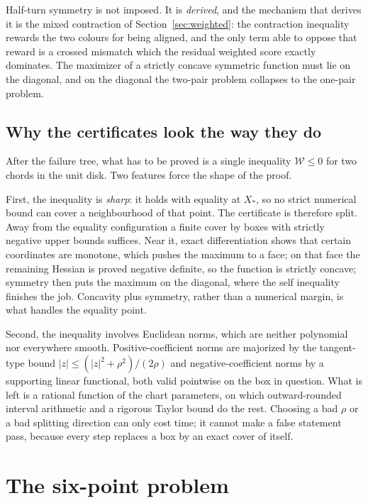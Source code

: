 \documentclass[11pt]{article}
\theoremstyle{plain}
\theoremstyle{definition}
\theoremstyle{remark}
\newcommand{\W}{\mathcal W}
\begin{document}
Half-turn symmetry is not imposed.  It is \emph{derived}, and the mechanism
that derives it is the mixed contraction of Section~\ref{sec:weighted}: the
contraction inequality rewards the two colours for being aligned, and the
only term able to oppose that reward is a crossed mismatch which the
residual weighted score exactly dominates.  The maximizer of a strictly
concave symmetric function must lie on the diagonal, and on the diagonal
the two-pair problem collapses to the one-pair problem.

\subsection{Why the certificates look the way they do}

After the failure tree, what has to be proved is a single inequality
$\W\le0$ for two chords in the unit disk.  Two features force the shape of
the proof.

First, the inequality is \emph{sharp}: it holds with equality at $X_*$, so
no strict numerical bound can cover a neighbourhood of that point.  The
certificate is therefore split.  Away from the equality configuration a
finite cover by boxes with strictly negative upper bounds suffices.  Near
it, exact differentiation shows that certain coordinates are monotone, which
pushes the maximum to a face; on that face the remaining Hessian is proved
negative definite, so the function is strictly concave; symmetry then puts
the maximum on the diagonal, where the self inequality finishes the job.
Concavity plus symmetry, rather than a numerical margin, is what handles the
equality point.

Second, the inequality involves Euclidean norms, which are neither
polynomial nor everywhere smooth.  Positive-coefficient norms are majorized
by the tangent-type bound $|z|\le(|z|^2+\rho^2)/(2\rho)$ and
negative-coefficient norms by a supporting linear functional, both valid
pointwise on the box in question.  What is left is a rational function of
the chart parameters, on which outward-rounded interval arithmetic and a
rigorous Taylor bound do the rest.  Choosing a bad $\rho$ or a bad splitting
direction can only cost time; it cannot make a false statement pass, because
every step replaces a box by an exact cover of itself.

\section{The six-point problem}\label{sec:problem}
\end{document}
